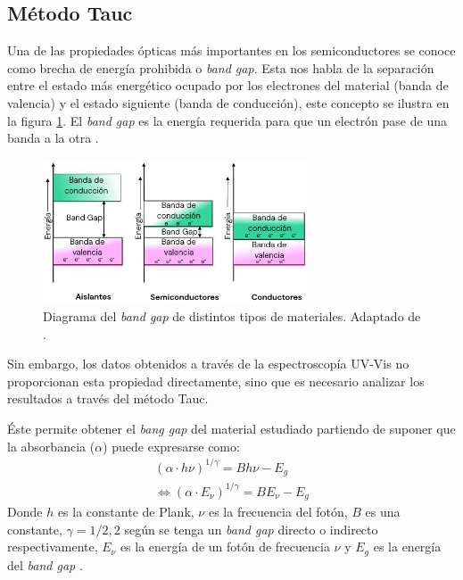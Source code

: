 \documentclass[../main.tex]{subfiles}
\begin{document}
\subsection{Método Tauc} \label{sec:metodotauc}
Una de las propiedades ópticas más importantes en los semiconductores se conoce como brecha de energía prohibida o \textit{band gap}. Esta nos habla de la separación entre el estado más energético ocupado por los electrones del material (banda de valencia) y el estado siguiente (banda de conducción), este concepto se ilustra en la figura \ref{fig:diagbandgap}. El \textit{band gap} es la energía requerida para que un electrón pase de una banda a la otra \cite{Ashcroft1976}.
\begin{figure}[H]
    \centering
    \includegraphics[width=0.7\textwidth]{fig/bandgapdiag.png}
    \caption{Diagrama del \textit{band gap} de distintos tipos de materiales. Adaptado de \cite{Ozan2020}.}
    \label{fig:diagbandgap}
\end{figure}
Sin embargo, los datos obtenidos a través de la espectroscopía UV-Vis no proporcionan esta propiedad directamente, sino que es necesario analizar los resultados a través del método Tauc.

Éste permite obtener el \textit{bang gap} del material estudiado partiendo de suponer que la absorbancia ($\alpha$) puede expresarse como:
\begin{equation}
    \begin{split}
        (\alpha\cdot h\nu)^{1/\gamma}=Bh\nu-E_g\\
        \iff (\alpha\cdot E_\nu)^{1/\gamma}=BE_\nu-E_g
    \end{split}
    \label{eq:taucalpha}
\end{equation}
Donde $h$ es la constante de Plank, $\nu$ es la frecuencia del fotón, $B$ es una constante, $\gamma=1/2, 2$ según se tenga un \textit{band gap} directo o indirecto respectivamente, $E_\nu$ es la energía de un fotón de frecuencia $\nu$ y $E_g$ es la energía del \textit{band gap} \cite{Makula2018}.
\end{document}
